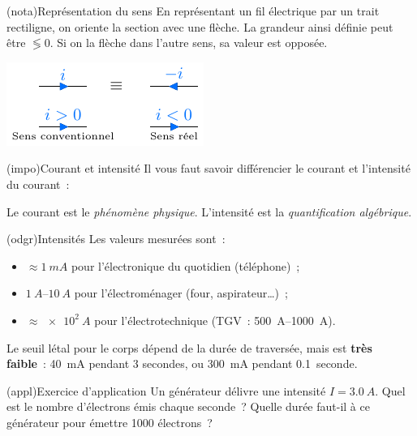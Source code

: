 \documentclass[../../main/main.tex]{subfiles}
\begin{document}
\begin{tcb}[label=nota:intensconv, sidebyside, righthand ratio=.4](nota){Représentation du sens}
	En représentant un fil électrique par un trait rectiligne, on oriente la
	section avec une flèche. La grandeur ainsi définie peut être $\lessgtr 0$.
	Si on la flèche dans l'autre sens, sa valeur est opposée.
	\tcblower
	\begin{center}
		\includegraphics[width=\linewidth]{intensconv}
	\end{center}
\end{tcb}
\begin{tcb}[label=impo:courantintensité](impo){Courant et intensité}
	Il vous faut savoir différencier le courant et l'intensité du courant~:
	\smallbreak
	\begin{isd}[cnt]
		Le courant est le \textit{phénomène physique}.
		\vspace*{-10pt}
		\tcblower
		L'intensité est la \textit{quantification algébrique}.
		\vspace*{-10pt}
	\end{isd}
\end{tcb}
\begin{tcb}[label=odgr:intensité](odgr){Intensités}
	Les valeurs mesurées sont~:

	\begin{itemize}
		\item $\approx \SI{1}{mA}$ pour l'électronique du quotidien
		      (téléphone)~;
		\item $\SIrange{1}{10}{A}$ pour l'électroménager (four,
		      aspirateur…)~;
		\item $\approx \SI{e2}{A}$ pour l'électrotechnique (TGV~:
		      \SIrange{500}{1000}{A}).
	\end{itemize}

	Le seuil létal pour le corps dépend de la durée de traversée, mais est
	\textbf{très faible}~: \SI{40}{mA} pendant 3 secondes, ou \SI{300}{mA}
	pendant \SI{0.1}{seconde}.

\end{tcb}
\begin{tcb}(appl){Exercice d'application}
	Un générateur délivre une intensité $I = \SI{3.0}{A}$. Quel est le
	nombre d'électrons émis chaque seconde~? Quelle durée faut-il à ce
	générateur pour émettre \num{1000} électrons~?
	\tcblower
	\vspace*{3cm}
\end{tcb}
\end{document}
